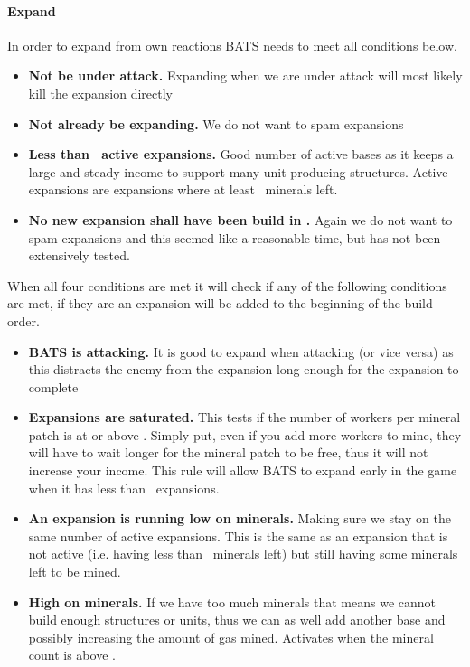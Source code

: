 \paragraph{Expand}
In order to expand from own reactions BATS needs to meet all conditions below.
\begin{itemize}
  \item \textbf{Not be under attack.} Expanding when we are under attack will most likely kill the expansion
	  directly
	\item \textbf{Not already be expanding.} We do not want to spam expansions
	\item \textbf{Less than \CommanderExpansionActiveMax~active expansions.} Good number of
	  active bases as it keeps a large and steady income to support many unit producing structures.
	  Active expansions are expansions where at least
	  \classificationExpansionExpansionMineralsLow~minerals left.
	\item \textbf{No new expansion shall have been build in \CommanderExpansionIntervalMin.} Again we do not
	  want to spam expansions and this seemed like a reasonable time, but has not been extensively
	  tested.
\end{itemize}
When all four conditions are met it will check if any of the following conditions are met, if they
are an expansion will be added to the beginning of the build order.
\begin{itemize}
	\item \textbf{BATS is attacking.} It is good to expand when attacking (or vice versa) as this
	  distracts the enemy from the expansion long enough for the expansion to complete\cite{day9}
	\item \textbf{Expansions are saturated.} This tests if the number of workers per mineral patch is at or
	  above \classificationExpansionWorkersPerMineralSaturation. Simply put, even if you add more
	  workers to mine, they will have to wait longer for the mineral patch to be free, thus it will
	  not increase your income. This rule will allow BATS to expand early in the game when it has
	  less than \CommanderExpansionActiveMax~expansions.
	\item \textbf{An expansion is running low on minerals.} Making sure we stay on the same number of active
	  expansions. This is the same as an expansion that is not active (i.e. having less than
	  \classificationExpansionExpansionMineralsLow~minerals left) but still having some minerals
	  left to be mined.
	\item \textbf{High on minerals.} If we have too much minerals that means we cannot build enough structures
	  or units, thus we can as well add another base and possibly increasing the amount of gas
	  mined. Activates when the mineral count is above \classificationHighOnMinerals.
\end{itemize}

